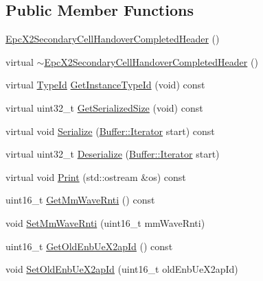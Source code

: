 \subsection*{Public Member Functions}
\begin{DoxyCompactItemize}
\item 
\hyperlink{classns3_1_1EpcX2SecondaryCellHandoverCompletedHeader_a9fa1131ccfc405a6ec749633ef8be8eb}{Epc\+X2\+Secondary\+Cell\+Handover\+Completed\+Header} ()
\item 
virtual \hyperlink{classns3_1_1EpcX2SecondaryCellHandoverCompletedHeader_a459b39f4110dc0532e84e12fbc001ccc}{$\sim$\+Epc\+X2\+Secondary\+Cell\+Handover\+Completed\+Header} ()
\item 
virtual \hyperlink{classns3_1_1TypeId}{Type\+Id} \hyperlink{classns3_1_1EpcX2SecondaryCellHandoverCompletedHeader_ac6e3e53ef73bcd9b80e010a91dd1ba95}{Get\+Instance\+Type\+Id} (void) const 
\item 
virtual uint32\+\_\+t \hyperlink{classns3_1_1EpcX2SecondaryCellHandoverCompletedHeader_a3e5ee42331c701f3f143c8c8062c78a0}{Get\+Serialized\+Size} (void) const 
\item 
virtual void \hyperlink{classns3_1_1EpcX2SecondaryCellHandoverCompletedHeader_ac4f3518a91e0ddbdaee45779ae74280e}{Serialize} (\hyperlink{classns3_1_1Buffer_1_1Iterator}{Buffer\+::\+Iterator} start) const 
\item 
virtual uint32\+\_\+t \hyperlink{classns3_1_1EpcX2SecondaryCellHandoverCompletedHeader_af296ad8dc690cb5c6639213851d8eb7f}{Deserialize} (\hyperlink{classns3_1_1Buffer_1_1Iterator}{Buffer\+::\+Iterator} start)
\item 
virtual void \hyperlink{classns3_1_1EpcX2SecondaryCellHandoverCompletedHeader_aaaa6b0e954e9a924ba31b7f638ca4997}{Print} (std\+::ostream \&os) const 
\item 
uint16\+\_\+t \hyperlink{classns3_1_1EpcX2SecondaryCellHandoverCompletedHeader_a91a582779a066a3dfac10082596cd8e9}{Get\+Mm\+Wave\+Rnti} () const 
\item 
void \hyperlink{classns3_1_1EpcX2SecondaryCellHandoverCompletedHeader_a658cadf2260b99acd576f4b867d6bde3}{Set\+Mm\+Wave\+Rnti} (uint16\+\_\+t mm\+Wave\+Rnti)
\item 
uint16\+\_\+t \hyperlink{classns3_1_1EpcX2SecondaryCellHandoverCompletedHeader_a5b537b0a2292953bf30c6b0633a7cc85}{Get\+Old\+Enb\+Ue\+X2ap\+Id} () const 
\item 
void \hyperlink{classns3_1_1EpcX2SecondaryCellHandoverCompletedHeader_a10cba94bbefba322e21776c29ebe7789}{Set\+Old\+Enb\+Ue\+X2ap\+Id} (uint16\+\_\+t old\+Enb\+Ue\+X2ap\+Id)

\end{DoxyCompactItemize}
